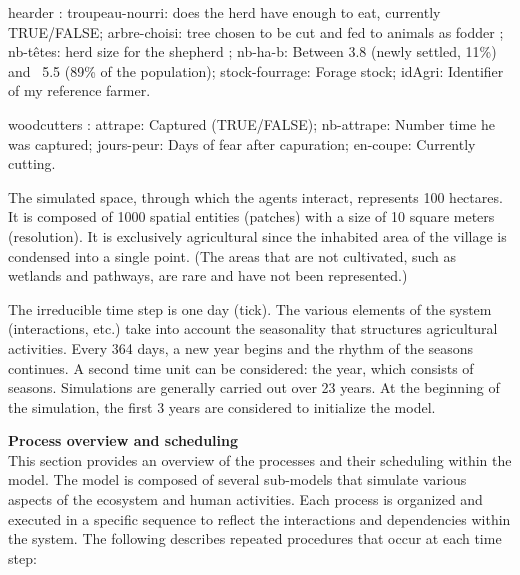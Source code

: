 \documentclass{article}
\begin{document}
        hearder : troupeau-nourri: does the herd have enough to eat, currently TRUE/FALSE; arbre-choisi: tree chosen to be cut and fed to animals as fodder ; nb-têtes: herd size for the shepherd ; nb-ha-b: Between 3.8 (newly settled, 11\%) and ~5.5 (89\% of the population); stock-fourrage: Forage stock; idAgri: Identifier of my reference farmer.

        woodcutters : attrape: Captured (TRUE/FALSE); nb-attrape: Number time he was captured; jours-peur: Days of fear after capuration; en-coupe: Currently cutting.


        The simulated space, through which the agents interact, represents 100 hectares. It is composed of 1000 spatial entities (patches) with a size of 10 square meters (resolution). It is exclusively agricultural since the inhabited area of the village is condensed into a single point. (The areas that are not cultivated, such as wetlands and pathways, are rare and have not been represented.)

        The irreducible time step is one day (tick). The various elements of the system (interactions, etc.) take into account the seasonality that structures agricultural activities. Every 364 days, a new year begins and the rhythm of the seasons continues. A second time unit can be considered: the year, which consists of seasons. Simulations are generally carried out over 23 years. At the beginning of the simulation, the first 3 years are considered to initialize the model.

    
        \textbf{Process overview and scheduling}\\

        This section provides an overview of the processes and their scheduling within the model. The model is composed of several sub-models that simulate various aspects of the ecosystem and human activities. Each process is organized and executed in a specific sequence to reflect the interactions and dependencies within the system. The following describes repeated procedures that occur at each time step:
\end{document}
